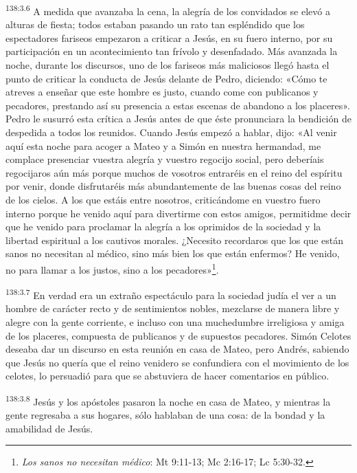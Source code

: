 \par
\textsuperscript{138:3.6} A medida que avanzaba la cena, la alegría de los convidados se elevó a alturas de fiesta; todos estaban pasando un rato tan espléndido que los espectadores fariseos empezaron a criticar a Jesús, en su fuero interno, por su participación en un acontecimiento tan frívolo y desenfadado. Más avanzada la noche, durante los discursos, uno de los fariseos más maliciosos llegó hasta el punto de criticar la conducta de Jesús delante de Pedro, diciendo: «Cómo te atreves a enseñar que este hombre es justo, cuando come con publicanos y pecadores, prestando así su presencia a estas escenas de abandono a los placeres». Pedro le susurró esta crítica a Jesús antes de que éste pronunciara la bendición de despedida a todos los reunidos. Cuando Jesús empezó a hablar, dijo: «Al venir aquí esta noche para acoger a Mateo y a Simón en nuestra hermandad, me complace presenciar vuestra alegría y vuestro regocijo social, pero deberíais regocijaros aún más porque muchos de vosotros entraréis en el reino del espíritu por venir, donde disfrutaréis más abundantemente de las buenas cosas del reino de los cielos. A los que estáis entre nosotros, criticándome en vuestro fuero interno porque he venido aquí para divertirme con estos amigos, permitidme decir que he venido para proclamar la alegría a los oprimidos de la sociedad y la libertad espiritual a los cautivos morales. ¿Necesito recordaros que los que están sanos no necesitan al médico, sino más bien los que están enfermos? He venido, no para llamar a los justos, sino a los pecadores»\footnote{\textit{Los sanos no necesitan médico}: Mt 9:11-13; Mc 2:16-17; Lc 5:30-32.}.

\par
\textsuperscript{138:3.7} En verdad era un extraño espectáculo para la sociedad judía el ver a un hombre de carácter recto y de sentimientos nobles, mezclarse de manera libre y alegre con la gente corriente, e incluso con una muchedumbre irreligiosa y amiga de los placeres, compuesta de publicanos y de supuestos pecadores. Simón Celotes deseaba dar un discurso en esta reunión en casa de Mateo, pero Andrés, sabiendo que Jesús no quería que el reino venidero se confundiera con el movimiento de los celotes, lo persuadió para que se abstuviera de hacer comentarios en público.

\par
\textsuperscript{138:3.8} Jesús y los apóstoles pasaron la noche en casa de Mateo, y mientras la gente regresaba a sus hogares, sólo hablaban de una cosa: de la bondad y la amabilidad de Jesús.

